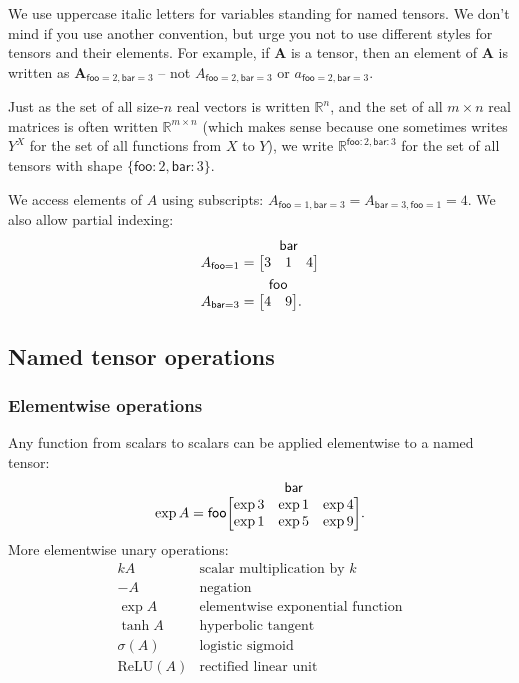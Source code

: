 \documentclass{article}
\makeatletter
\newcommand{\name}[1]{\mathsf{#1}}
\newcommand{\nidx}[2]{\name{#1}=#2}
\newcommand{\nset}[2]{\name{#1}:#2}
\newcommand{\tuple}[1]{\{ #1\}}
\newcommand{\nmatrix}[3]{\name{#1}\begin{array}[b]{@{}c@{}}\name{#2}\\\begin{bmatrix}#3\end{bmatrix}\end{array}}
\makeatother
\begin{document}
We use uppercase italic letters for variables standing for named tensors. We don't mind if you use another convention, but urge you not to use different styles for tensors and their elements. For example, if $\mathbf{A}$ is a tensor, then an element of $\mathbf{A}$ is written as $\mathbf{A}_{\nidx{foo}{2}, \nidx{bar}{3}}$ -- 
not $A_{\nidx{foo}{2},\nidx{bar}{3}}$ or $a_{\nidx{foo}{2},\nidx{bar}{3}}$.

Just as the set of all size-$n$ real vectors is written $\mathbb{R}^n$, and the set of all $m\times n$ real matrices is often written $\mathbb{R}^{m \times n}$ (which makes sense because one sometimes writes $Y^X$ for the set of all functions from $X$ to $Y$), we write $\mathbb{R}^{\nset{foo}{2}, \nset{bar}{3}}$ for the set of all tensors with shape $\tuple{\nset{foo}{2}, \nset{bar}{3}}$.

We access elements of $A$ using subscripts: $A_{\nidx{foo}{1}, \nidx{bar}{3}} = A_{\nidx{bar}{3}, \nidx{foo}{1}} = 4$.
We also allow partial indexing:
\begin{align*}
A_{\nidx{foo}{1}} &= \nmatrix{}{bar}{
  3 & 1 & 4
}
\\
A_{\nidx{bar}{3}} &= \nmatrix{}{foo}{
  4 & 9
}.
\end{align*}

\subsection{Named tensor operations}
\label{sec:operations}

\subsubsection{Elementwise operations}

Any function from scalars to scalars can be applied elementwise to a named tensor:
\begin{equation*}
\exp A = \nmatrix{foo}{bar}{
  \exp 3 & \exp 1 & \exp 4 \\
  \exp 1 & \exp 5 & \exp 9
}.
\end{equation*}
More elementwise unary operations:
\[\begin{array}{cl}
kA & \text{scalar multiplication by $k$} \\
-A & \text{negation} \\
\exp A & \text{elementwise exponential function} \\
\tanh A & \text{hyperbolic tangent} \\
\sigma(A) & \text{logistic sigmoid} \\
\text{ReLU}(A) & \text{rectified linear unit}
\end{array}\]
\end{document}
